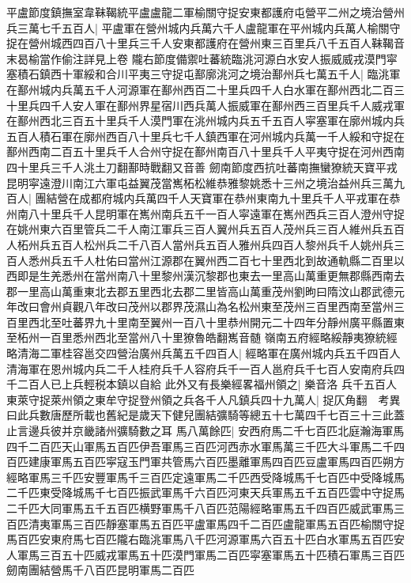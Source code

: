 平盧節度鎮撫室韋靺鞨統平盧盧龍二軍榆關守捉安東都護府屯營平二州之境治營州兵三萬七千五百人|{
	平盧軍在營州城内兵萬六千人盧龍軍在平州城内兵萬人榆關守捉在營州城西四百八十里兵三千人安東都護府在營州東三百里兵八千五百人靺鞨音末曷榆當作偷注詳見上卷}
隴右節度備禦吐蕃統臨洮河源白水安人振威威戎漠門寜塞積石鎮西十軍綏和合川平夷三守捉屯鄯廓洮河之境治鄯州兵七萬五千人|{
	臨洮軍在鄯州城内兵萬五千人河源軍在鄯州西百二十里兵四千人白水軍在鄯州西北二百三十里兵四千人安人軍在鄯州界星宿川西兵萬人振威軍在鄯州西三百里兵千人威戎軍在鄯州西北三百五十里兵千人漠門軍在洮州城内兵五千五百人寜塞軍在廓州城内兵五百人積石軍在廓州西百八十里兵七千人鎮西軍在河州城内兵萬一千人綏和守捉在鄯州西南二百五十里兵千人合州守捉在鄯州南百八十里兵千人平夷守捉在河州西南四十里兵三千人洮土刀翻鄯時戰翻又音善}
劒南節度西抗吐蕃南撫蠻獠統天寶平戎昆明寜遠澄川南江六軍屯益翼茂當嶲柘松維恭雅黎姚悉十三州之境治益州兵三萬九百人|{
	團結營在成都府城内兵萬四千人天寶軍在恭州東南九十里兵千人平戎軍在恭州南八十里兵千人昆明軍在嶲州南兵五千一百人寜遠軍在嶲州西兵三百人澄州守捉在姚州東六百里管兵二千人南江軍兵三百人翼州兵五百人茂州兵三百人維州兵五百人柘州兵五百人松州兵二千八百人當州兵五百人雅州兵四百人黎州兵千人姚州兵三百人悉州兵五千人杜佑曰當州江源郡在翼州西二百七十里西北到故通軌縣二百里以西即是生羌悉州在當州南八十里黎州漢沉黎郡也東去一里高山萬重更無郡縣西南去郡一里高山萬重東北去郡五里西北去郡二里皆高山萬重茂州劉昫曰隋汶山郡武德元年改曰會州貞觀八年改曰茂州以郡界茂濕山為名松州東至茂州三百里西南至當州三百里西北至吐蕃界九十里南至翼州一百八十里恭州開元二十四年分靜州廣平縣置東至柘州一百里悉州西北至當州八十里獠魯皓翻嶲音髄}
嶺南五府經略綏靜夷獠統經略清海二軍桂容邕交四營治廣州兵萬五千四百人|{
	經略軍在廣州城内兵五千四百人清海軍在恩州城内兵二千人桂府兵千人容府兵千一百人邕府兵千七百人安南府兵四千二百人已上兵輕税本鎮以自給}
此外又有長樂經畧福州領之|{
	樂音洛}
兵千五百人東萊守捉萊州領之東牟守捉登州領之兵各千人凡鎮兵四十九萬人|{
	捉仄角翻　考異曰此兵數唐歷所載也舊紀是歲天下健兒團結彍騎等總五十七萬四千七百三十三此蓋止言邊兵彼并京畿諸州彍騎數之耳}
馬八萬餘匹|{
	安西府馬二千七百匹北庭瀚海軍馬四千二百匹天山軍馬五百匹伊吾軍馬三百匹河西赤水軍馬萬三千匹大斗軍馬二千四百匹建康軍馬五百匹寜寇玉門軍共管馬六百匹墨離軍馬四百匹豆盧軍馬四百匹朔方經略軍馬三千匹安豐軍馬千三百匹定遠軍馬二千匹西受降城馬千七百匹中受降城馬二千匹東受降城馬千七百匹振武軍馬千六百匹河東天兵軍馬五千五百匹雲中守捉馬二千匹大同軍馬五千五百匹横野軍馬千八百匹范陽經略軍馬五千四百匹威武軍馬三百匹清夷軍馬三百匹靜塞軍馬五百匹平盧軍馬四千二百匹盧龍軍馬五百匹榆關守捉馬百匹安東府馬七百匹隴右臨洮軍馬八千匹河源軍馬六百五十匹白水軍馬五百匹安人軍馬三百五十匹威戎軍馬五十匹漠門軍馬二百匹寜塞軍馬五十匹積石軍馬三百匹劒南團結營馬千八百匹昆明軍馬二百匹}
